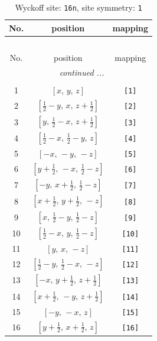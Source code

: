 \documentclass[fleqn,8pt]{jsarticle}
\begin{document}
\begin{longtable}{ccc}
\caption{Wyckoff site: {\tt 16n}, site symmetry: {\tt 1}}
 \\
 \hline \hline
No. & position & mapping \\ \hline \endfirsthead

\multicolumn{2}{l}{\tablename\ \thetable{}} \\
 \hline \hline
No. & position & mapping \\ \hline \endhead

 \hline \hline
\multicolumn{2}{r}{\footnotesize\it continued ...} \\ \endfoot

 \hline \hline
\multicolumn{2}{r}{} \\ \endlastfoot

1 & $\left[ x,\, y,\, z \right]$ & {\tt [1]} \\ \hline
2 & $\left[ \frac{1}{2} - y,\, x,\, z + \frac{1}{2} \right]$ & {\tt [2]} \\ \hline
3 & $\left[ y,\, \frac{1}{2} - x,\, z + \frac{1}{2} \right]$ & {\tt [3]} \\ \hline
4 & $\left[ \frac{1}{2} - x,\, \frac{1}{2} - y,\, z \right]$ & {\tt [4]} \\ \hline
5 & $\left[ - x,\, - y,\, - z \right]$ & {\tt [5]} \\ \hline
6 & $\left[ y + \frac{1}{2},\, - x,\, \frac{1}{2} - z \right]$ & {\tt [6]} \\ \hline
7 & $\left[ - y,\, x + \frac{1}{2},\, \frac{1}{2} - z \right]$ & {\tt [7]} \\ \hline
8 & $\left[ x + \frac{1}{2},\, y + \frac{1}{2},\, - z \right]$ & {\tt [8]} \\ \hline
9 & $\left[ x,\, \frac{1}{2} - y,\, \frac{1}{2} - z \right]$ & {\tt [9]} \\ \hline
10 & $\left[ \frac{1}{2} - x,\, y,\, \frac{1}{2} - z \right]$ & {\tt [10]} \\ \hline
11 & $\left[ y,\, x,\, - z \right]$ & {\tt [11]} \\ \hline
12 & $\left[ \frac{1}{2} - y,\, \frac{1}{2} - x,\, - z \right]$ & {\tt [12]} \\ \hline
13 & $\left[ - x,\, y + \frac{1}{2},\, z + \frac{1}{2} \right]$ & {\tt [13]} \\ \hline
14 & $\left[ x + \frac{1}{2},\, - y,\, z + \frac{1}{2} \right]$ & {\tt [14]} \\ \hline
15 & $\left[ - y,\, - x,\, z \right]$ & {\tt [15]} \\ \hline
16 & $\left[ y + \frac{1}{2},\, x + \frac{1}{2},\, z \right]$ & {\tt [16]} \\
\end{longtable}
\end{document}
